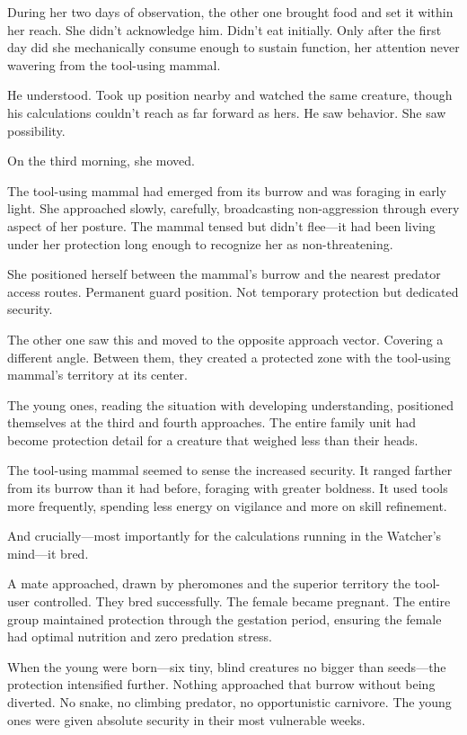 During her two days of observation, the other one brought food and set it within her reach. She didn't acknowledge him. Didn't eat initially. Only after the first day did she mechanically consume enough to sustain function, her attention never wavering from the tool-using mammal.

He understood. Took up position nearby and watched the same creature, though his calculations couldn't reach as far forward as hers. He saw behavior. She saw possibility.

On the third morning, she moved.

The tool-using mammal had emerged from its burrow and was foraging in early light. She approached slowly, carefully, broadcasting non-aggression through every aspect of her posture. The mammal tensed but didn't flee—it had been living under her protection long enough to recognize her as non-threatening.

She positioned herself between the mammal's burrow and the nearest predator access routes. Permanent guard position. Not temporary protection but dedicated security.

The other one saw this and moved to the opposite approach vector. Covering a different angle. Between them, they created a protected zone with the tool-using mammal's territory at its center.

The young ones, reading the situation with developing understanding, positioned themselves at the third and fourth approaches. The entire family unit had become protection detail for a creature that weighed less than their heads.

The tool-using mammal seemed to sense the increased security. It ranged farther from its burrow than it had before, foraging with greater boldness. It used tools more frequently, spending less energy on vigilance and more on skill refinement.

And crucially—most importantly for the calculations running in the Watcher's mind—it bred.

A mate approached, drawn by pheromones and the superior territory the tool-user controlled. They bred successfully. The female became pregnant. The entire group maintained protection through the gestation period, ensuring the female had optimal nutrition and zero predation stress.

When the young were born—six tiny, blind creatures no bigger than seeds—the protection intensified further. Nothing approached that burrow without being diverted. No snake, no climbing predator, no opportunistic carnivore. The young ones were given absolute security in their most vulnerable weeks.

